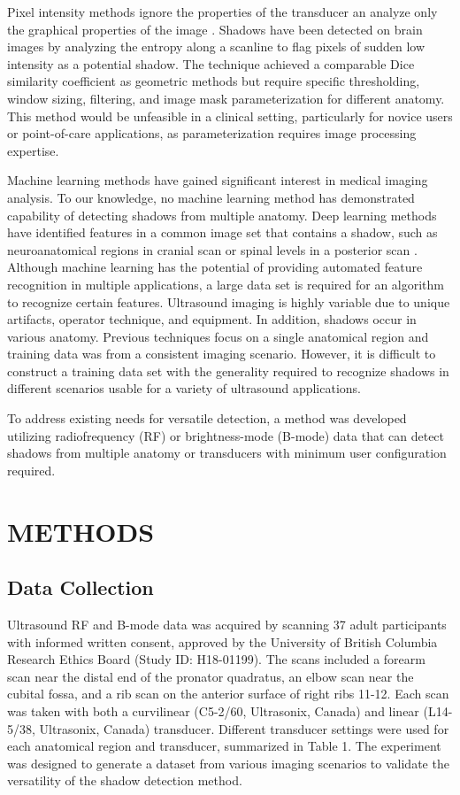 \documentclass[preprint,5p,authoryear]{elsarticle}
\begin{document}
Pixel intensity methods ignore the properties of the transducer an analyze only the graphical properties of the image \citep{Hellier2010}. Shadows have been detected on brain images by analyzing the entropy along a scanline to flag pixels of sudden low intensity as a potential shadow. The technique achieved a comparable Dice similarity coefficient as geometric methods but require specific thresholding, window sizing, filtering, and image mask parameterization for different anatomy. This method would be unfeasible in a clinical setting, particularly for novice users or point-of-care applications, as parameterization requires image processing expertise.

Machine learning methods have gained significant interest in medical imaging analysis. To our knowledge, no machine learning method has demonstrated capability of detecting shadows from multiple anatomy. Deep learning methods have identified features in a common image set that contains a shadow, such as neuroanatomical regions in cranial scan \citep{Milletari2017} or spinal levels in a posterior scan \citep{Hetherington2017}. Although machine learning has the potential of providing automated feature recognition in multiple applications, a large data set is required for an algorithm to recognize certain features. Ultrasound imaging is highly variable due to unique artifacts, operator technique, and equipment. In addition, shadows occur in various anatomy. Previous techniques focus on a single anatomical region and training data was from a consistent imaging scenario. However, it is difficult to construct a training data set with the generality required to recognize shadows in different scenarios usable for a variety of ultrasound applications.

To address existing needs for versatile detection, a method was developed utilizing radiofrequency (RF) or brightness-mode (B-mode) data that can detect shadows from multiple anatomy or transducers with minimum user configuration required. 

\section*{METHODS}
\label{MaM}
     
\subsection*{Data Collection}
Ultrasound RF and B-mode data was acquired by scanning 37 adult participants with informed written consent, approved by the University of British Columbia Research Ethics Board (Study ID: H18-01199). The scans included a forearm scan near the distal end of the pronator quadratus, an elbow scan near the cubital fossa, and a rib scan on the anterior surface of right ribs 11-12. Each scan was taken with both a curvilinear (C5-2/60, Ultrasonix, Canada) and linear (L14-5/38, Ultrasonix, Canada) transducer. Different transducer settings were used for each anatomical region and transducer, summarized in Table 1. The experiment was designed to generate a dataset from various imaging scenarios to validate the versatility of the shadow detection method.
\end{document}
